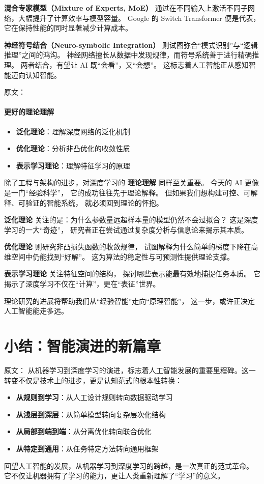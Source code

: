 {\bf 混合专家模型（Mixture of Experts, MoE）}  
通过在不同输入上激活不同子网络，大幅提升了计算效率与模型容量。  
Google 的 Switch Transformer 便是代表，它在保持性能的同时显著减少计算成本。  

{\bf 神经符号结合（Neuro-symbolic Integration）}  
则试图弥合“模式识别”与“逻辑推理”之间的鸿沟。  
神经网络擅长从数据中发现规律，而符号系统善于进行精确推理。  
两者结合，有望让 AI 既“会看”，又“会想”。  
这标志着人工智能正从感知智能迈向认知智能。


原文：
\paragraph{更好的理论理解}
\begin{itemize}
\item {\bf 泛化理论}：理解深度网络的泛化机制
\item {\bf 优化理论}：分析非凸优化的收敛性质
\item {\bf 表示学习理论}：理解特征学习的原理
\end{itemize}
除了工程与架构的进步，对深度学习的 {\bf 理论理解} 同样至关重要。  
今天的 AI 更像是一门“经验科学”，  
它的成功往往先于理论解释。  
但如果我们想构建可控、可解释、可验证的智能系统，  
就必须回到理论的怀抱。  

{\bf 泛化理论} 关注的是：为什么参数量远超样本量的模型仍然不会过拟合？  
这是深度学习的一大“奇迹”，  
研究者正在尝试通过复杂度分析与信息论来揭示其本质。  

{\bf 优化理论} 则研究非凸损失函数的收敛规律，  
试图解释为什么简单的梯度下降在高维空间中仍能找到“好解”。  
这为算法的稳定性与可预测性提供理论支撑。  

{\bf 表示学习理论} 关注特征空间的结构，  
探讨哪些表示能最有效地捕捉任务本质。  
它揭示了深度学习不仅在“计算”，更在“表征”世界。  

理论研究的进展将帮助我们从“经验智能”走向“原理智能”，  
这一步，或许正决定人工智能能走多远。


\section{小结：智能演进的新篇章}

原文：
从机器学习到深度学习的演进，标志着人工智能发展的重要里程碑。这一转变不仅是技术上的进步，更是认知范式的根本性转换：
\begin{itemize}
\item {\bf 从规则到学习}：从人工设计规则转向数据驱动学习
\item {\bf 从浅层到深层}：从简单模型转向复杂层次化结构
\item {\bf 从局部到端到端}：从分离优化转向联合优化
\item {\bf 从特定到通用}：从任务特定方法转向通用框架
\end{itemize}
回望人工智能的发展，从机器学习到深度学习的跨越，是一次真正的范式革命。  
它不仅让机器拥有了学习的能力，更让人类重新理解了“学习”的意义。  

